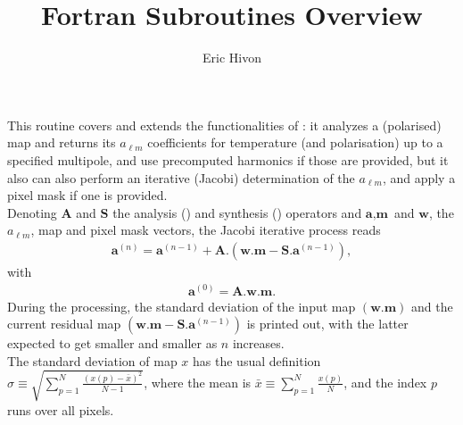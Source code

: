 
\sloppy


\title{\healpix Fortran Subroutines Overview}
 \section[map2alm\_iterative*]{ }
\label{sub:map2alm_iterative}
\author{Eric Hivon}

\begin{facility}
{This routine covers and extends the functionalities of : it
analyzes a (polarised)  map and returns
its $a_{\ell m}$ coefficients for temperature (and polarisation) up to a specified
multipole, and use precomputed harmonics if those
are provided, but it also can also perform an iterative (Jacobi) determination of the $a_{\ell m}$, and
apply a pixel mask if one is provided.\\
\newcommand{\bA}{\textbf{A}}
\newcommand{\bS}{\textbf{S}}
\newcommand{\ba}{\textbf{a}}
\newcommand{\bm}{\textbf{m}}
\newcommand{\bw}{\textbf{w}}
Denoting $\bA$ and $\bS$ the 
analysis  () and
synthesis ()
operators and  $\ba, \bm$ and $\bw$, the $a_{\ell m}$, map and pixel mask vectors, the
Jacobi iterative process reads 
\begin{eqnarray}
	\ba^{(n)} = \ba^{(n-1)} + \bA. \left( \bw.\bm - \bS .\ba^{(n-1)} \right),
\end{eqnarray}
with
\begin{eqnarray}
	\ba^{(0)} = \bA.\bw.\bm.
\end{eqnarray}
%
During the processing, the standard deviation of the input map $\left(\bw.\bm\right)$ 
and the current residual map $\left(\bw.\bm - \bS .\ba^{(n-1)}\right)$ is printed out, with the latter expected
to get smaller and smaller as $n$ increases.\\
The standard deviation of map $x$ has the usual definition
$\sigma \equiv \sqrt{\sum_{p=1}^{N}\frac{(x(p)-\bar{x})^2}{N-1}}$, where the mean is
$\bar{x} \equiv  \sum_{p=1}^{N} \frac{x(p)}{N}$, and the index $p$ runs over all pixels.%
\\
}
\end{facility}
